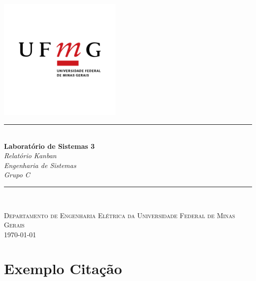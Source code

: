 \documentclass[12pt,a4paper]{article}
\newcommand{\HRule}{\rule{\linewidth}{0.5mm}} %
\begin{document}
\begin{titlepage}
\begin{center}

~\\[1.5cm]
\includegraphics[width=0.45\textwidth]{UFMG.png}~\\[1.5cm]

\HRule \\[0.4cm]
{ \LARGE 
  \textbf{Laboratório de Sistemas 3}\\[0.4cm]
  \emph{Relatório Kanban}\\[0.4cm]
  \emph{Engenharia de Sistemas}\\[0.3cm]
  \emph{Grupo C}\\[0.3cm]
}
\HRule \\[1.5cm]

\vfill

\textsc{\large Departamento de Engenharia Elétrica da Universidade Federal de Minas Gerais}\\[0.4cm]

{\large \today}

\end{center}
\end{titlepage}

\newpage
\tableofcontents %
\newpage

\setcounter{page}{1}


\section{Exemplo Citação}
\end{document}
